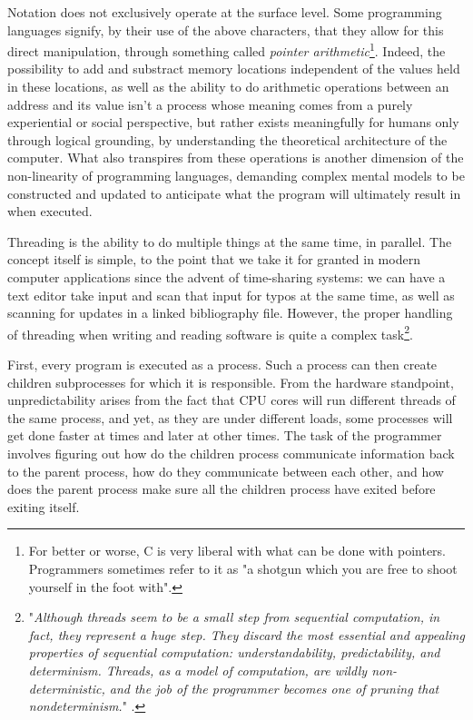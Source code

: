 Notation does not exclusively operate at the surface level. Some programming languages signify, by their use of the above characters, that they allow for this direct manipulation, through something called \emph{pointer arithmetic}\footnote{For better or worse, C is very liberal with what can be done with pointers. Programmers sometimes refer to it as "a shotgun which you are free to shoot yourself in the foot with".}. Indeed, the possibility to add and substract memory locations independent of the values held in these locations, as well as the ability to do arithmetic operations between an address and its value isn't a process whose meaning comes from a purely experiential or social perspective, but rather exists meaningfully for humans only through logical grounding, by understanding the theoretical architecture of the computer. What also transpires from these operations is another dimension of the non-linearity of programming languages, demanding complex mental models to be constructed and updated to anticipate what the program will ultimately result in when executed.

Threading is the ability to do multiple things at the same time, in parallel. The concept itself is simple, to the point that we take it for granted in modern computer applications since the advent of time-sharing systems: we can have a text editor take input and scan that input for typos at the same time, as well as scanning for updates in a linked bibliography file. However, the proper handling of threading when writing and reading software is quite a complex task\footnote{"\emph{Although threads seem to be a small step from sequential computation, in fact, they represent a huge step. They discard the most essential and appealing properties of sequential computation: understandability, predictability, and determinism. Threads, as a model of computation, are wildly non-deterministic, and the job of the programmer becomes one of pruning that nondeterminism.}" \citep{lee_problem_2006}.}.

First, every program is executed as a process. Such a process can then create children subprocesses for which it is responsible. From the hardware standpoint, unpredictability arises from the fact that CPU cores will run different threads of the same process, and yet, as they are under different loads, some processes will get done faster at times and later at other times. The task of the programmer involves figuring out how do the children process communicate information back to the parent process, how do they communicate between each other, and how does the parent process make sure all the children process have exited before exiting itself.

